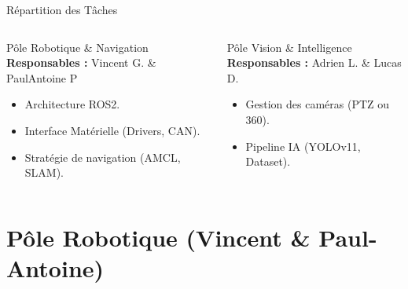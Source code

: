 \documentclass[aspectratio=169]{beamer}
\begin{document}
\begin{frame}{Répartition des Tâches}

    \begin{columns}[t]
        \begin{block}{Pôle Robotique \& Navigation}
            \textbf{Responsables :} Vincent G. \&  PaulAntoine P
            \begin{itemize}
                \item Architecture ROS2.
                \item Interface Matérielle (Drivers, CAN).
                \item Stratégie de navigation (AMCL, SLAM).
            \end{itemize}
        \end{block}

        \begin{block}{Pôle Vision \& Intelligence}
            \textbf{Responsables :} Adrien L. \& Lucas D.    
            \begin{itemize}
                \item Gestion des caméras (PTZ ou 360).
                \item Pipeline IA (YOLOv11, Dataset).
            \end{itemize}
        \end{block}
    \end{columns}
\end{frame}

\section{Pôle Robotique (Vincent \& Paul-Antoine)}
\end{document}
